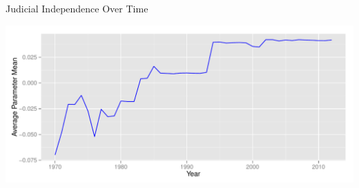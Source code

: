 \documentclass{beamer}              %
\begin{document}
\subsection{}
\begin{frame}{Judicial Independence Over Time}
\begin{center}
\includegraphics[scale=.5]{graphics/fiveind/meanavgtime}
\end{center}
\end{frame}
\end{document}
